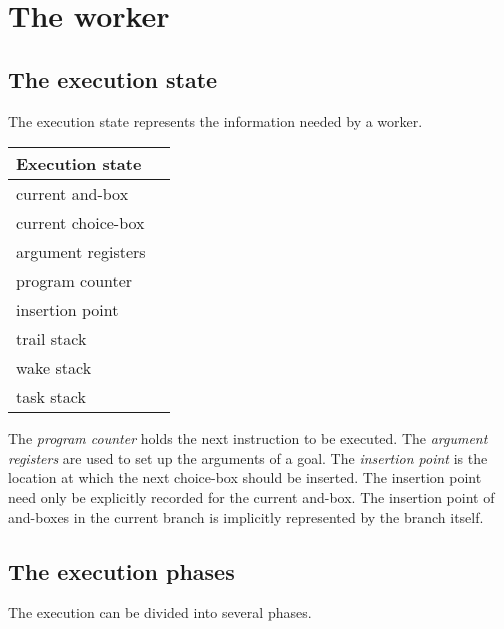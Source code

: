 \section{The worker}


\subsection*{The execution state}

The execution state represents the information needed by a worker.


\begin{center} \begin{tabular}{|l|l|}\hline
Execution state\\
\hline
\hline
current and-box \\
current choice-box \\
argument registers\\
program counter \\
insertion point \\
trail stack \\
wake stack\\
task stack\\
\hline
\end{tabular} \end{center}

The {\em program counter} holds the next instruction to be executed.
The {\em argument registers} are used to set up the arguments of a
goal. The {\em insertion point} is the location at which the
next choice-box should be inserted. The insertion point need only be
explicitly recorded for the current and-box. The insertion point of
and-boxes in the current branch is implicitly represented by the
branch itself.

\subsection*{The execution phases}

The execution can be divided into several phases.


